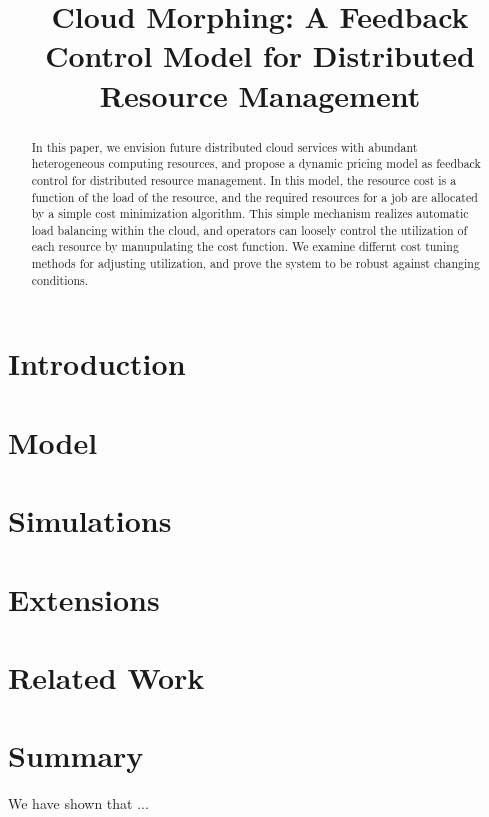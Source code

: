 \documentclass[10pt,sigconf,letterpaper,anonymous,nonacm]{acmart}
\title{Cloud Morphing: A Feedback Control Model for Distributed Resource Management}
\begin{document}
\begin{abstract}

In this paper, we envision future distributed cloud services with
abundant heterogeneous computing resources,
and propose a dynamic pricing model as feedback control for
distributed resource management.
In this model, the resource cost is a function of the load of the
resource, and the required resources for a job are allocated by a
simple cost minimization algorithm.  This simple mechanism realizes
automatic load balancing within the cloud, and operators can loosely
control the utilization of each resource by manupulating the cost function.
We examine differnt cost tuning methods for adjusting utilization, and
prove the system to be robust against changing conditions.

\end{abstract}

\maketitle

\section{Introduction}



\section{Model}



\section{Simulations}



\section{Extensions}



\section{Related Work}



\section{Summary}

We have shown that ...



\end{document}
